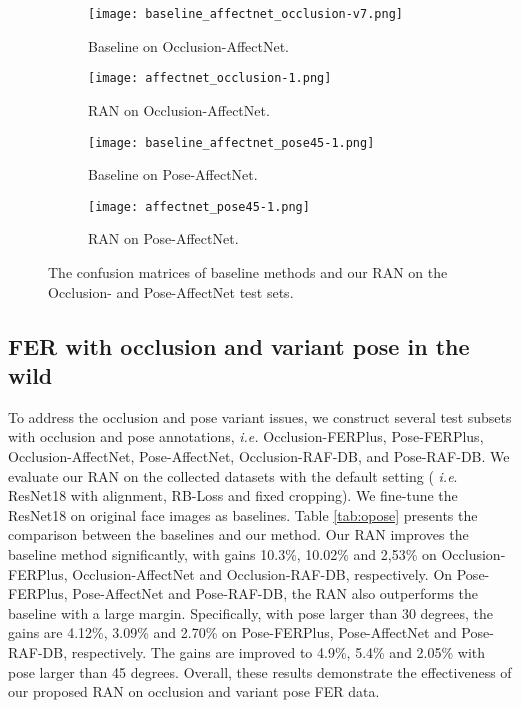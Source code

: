 \documentclass[journal]{IEEEtran}
\newcommand{\kwang}[1]{\textcolor[rgb]{0,0,0}{#1}}
\newcommand{\rpxj}[1]{\textcolor[rgb]{0,0,0}{#1}}
\begin{document}
\begin{figure*}[t]
\captionsetup[subfigure]{labelformat=empty}
\begin{subfigure}{.24\textwidth}
  \centering
\texttt{[image: baseline\_affectnet\_occlusion-v7.png]}  
  \caption{\small{Baseline on Occlusion-AffectNet.}
  \label{fig:sub-first}}
\end{subfigure}
\begin{subfigure}{.24\textwidth}
  \centering
\texttt{[image: affectnet\_occlusion-1.png]}  
  \caption{\small{RAN on Occlusion-AffectNet.}}
  \label{fig:sub-second}
\end{subfigure}
\begin{subfigure}{.24\textwidth}
  \centering
\texttt{[image: baseline\_affectnet\_pose45-1.png]}  
  \caption{\small{Baseline on Pose-AffectNet.}}
  \label{fig:sub-third}
\end{subfigure}
\begin{subfigure}{.24\textwidth}
  \centering
\texttt{[image: affectnet\_pose45-1.png]}  
  \caption{\small{RAN on Pose-AffectNet.}}
  \label{fig:sub-forth}
\end{subfigure}
\caption{The confusion matrices of baseline methods and our RAN on the Occlusion- and Pose-AffectNet test sets.}
\label{fig:confusion_metrics_affectnet}
\end{figure*}

\subsection{FER with occlusion and variant pose in the wild}
To address the occlusion and pose variant issues, we construct several test subsets with occlusion and pose annotations, \textit{i.e.} Occlusion-FERPlus,  Pose-FERPlus,  Occlusion-AffectNet, Pose-AffectNet, \rpxj{Occlusion-RAF-DB, and Pose-RAF-DB.}
We evaluate our RAN on the collected datasets with the default setting (\textit{ i.e}. ResNet18 with alignment, RB-Loss and fixed cropping). We fine-tune the ResNet18 on original face images as baselines. Table \ref{tab:opose} presents the comparison between the baselines and our method. 
\kwang{Our RAN improves the baseline method significantly, with gains 10.3\%, 10.02\% and 2,53\% on Occlusion-FERPlus, Occlusion-AffectNet and Occlusion-RAF-DB, respectively. On Pose-FERPlus, Pose-AffectNet and Pose-RAF-DB, the RAN also outperforms the baseline with a large margin. Specifically, with pose larger than 30 degrees, the gains are 4.12\%, 3.09\% and 2.70\% on Pose-FERPlus, Pose-AffectNet and Pose-RAF-DB, respectively. The gains are improved to 4.9\%, 5.4\% and 2.05\% with pose larger than 45 degrees. Overall, these results demonstrate the effectiveness of our proposed RAN on occlusion and variant pose FER data.}
\end{document}
